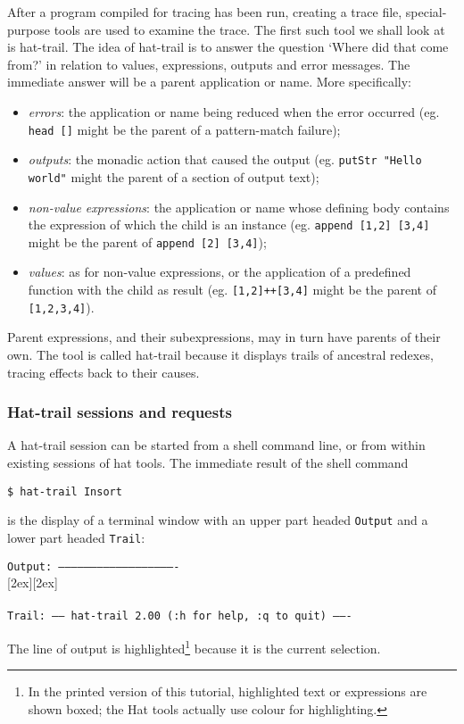 \documentclass[12pt]{article}
\newcommand{\highlight}[1]{\raisebox{0pt}[2ex][2ex]{\fbox{\tt #1}}}
\begin{document}
After a program compiled for tracing has been run, creating a trace file,
special-purpose tools are used to examine the trace.
The first such tool we shall look at is hat-trail.
The idea of hat-trail is to answer the question `Where did that come
from?' in relation to values, expressions, outputs and error messages.
The immediate answer will be a parent application or name.
More specifically:
\begin{itemize}
\item {\em errors}:
the application or name being reduced when the error occurred
(eg. {\tt head []} might be the parent of a pattern-match failure);

\item {\em outputs}:
the monadic action that caused the output
(eg. {\tt putStr "Hello world"} might the parent of a section of output text);
 
\item {\em non-value expressions}:
the application or name whose defining body
contains the expression of which the child is an instance
(eg. {\tt append [1,2] [3,4]} might be the parent of {\tt append [2] [3,4]});
 
\item {\em values}:
as for non-value expressions, or the application of a
predefined function with the child as result
(eg. {\tt [1,2]++[3,4]} might be the parent of {\tt [1,2,3,4]}).
\end{itemize}
Parent expressions, and their subexpressions, may in turn have parents
of their own.
The tool is called hat-trail because it
displays trails of ancestral redexes, tracing effects back to their
causes.

\subsubsection*{Hat-trail sessions and requests}
A hat-trail session can be started from a shell command line, or from
within existing sessions of hat tools.
The immediate result of the shell command
\begin{tabbing}
{\tt \$ hat-trail Insort}
\end{tabbing}
is the display of a terminal window with an upper part headed {\tt Output}
and a lower part headed {\tt Trail}:
\begin{tabbing}
{\tt Output:\ -------------------------------------------------------} \\
\highlight{agmoprr\char92n} \\
\\
{\tt Trail:\ ------ hat-trail 2.00  (:h for help, :q to quit) -------}
\end{tabbing}
The line of output is highlighted\footnote{
In the printed version of this tutorial, highlighted text or
expressions are shown boxed; the Hat tools actually use colour for
highlighting.}
because it is the current selection.
\end{document}
